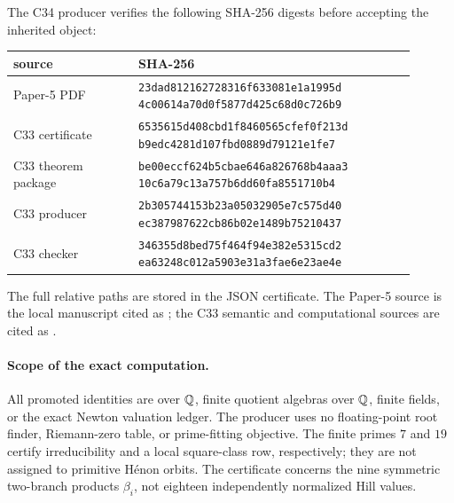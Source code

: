 The C34 producer verifies the following SHA-256 digests before accepting the
inherited object:
\begin{center}
\begin{tabular}{p{0.28\linewidth}p{0.62\linewidth}}
\toprule
source & SHA-256 \\
\midrule
Paper-5 PDF & \shortstack[l]{\scriptsize\texttt{23dad812162728316f633081e1a1995d}\\[-1pt]
\scriptsize\texttt{4c00614a70d0f5877d425c68d0c726b9}} \\
C33 certificate & \shortstack[l]{\scriptsize\texttt{6535615d408cbd1f8460565cfef0f213d}\\[-1pt]
\scriptsize\texttt{b9edc4281d107fbd0889d79121e1fe7}} \\
C33 theorem package & \shortstack[l]{\scriptsize\texttt{be00eccf624b5cbae646a826768b4aaa3}\\[-1pt]
\scriptsize\texttt{10c6a79c13a757b6dd60fa8551710b4}} \\
C33 producer & \shortstack[l]{\scriptsize\texttt{2b305744153b23a05032905e7c575d40}\\[-1pt]
\scriptsize\texttt{ec387987622cb86b02e1489b75210437}} \\
C33 checker & \shortstack[l]{\scriptsize\texttt{346355d8bed75f464f94e382e5315cd2}\\[-1pt]
\scriptsize\texttt{ea63248c012a5903e31a3fae6e23ae4e}} \\
\bottomrule
\end{tabular}
\end{center}

The full relative paths are stored in the JSON certificate.  The Paper-5
source is the local manuscript cited as \citet{wang2026henonmodel}; the C33
semantic and computational sources are cited as
\citet{hcs2026c33note,hcs2026c33certificate}.

\paragraph{Scope of the exact computation.}
All promoted identities are over \(\mathbb{Q}\), finite quotient algebras over
\(\mathbb{Q}\), finite fields, or the exact Newton valuation ledger.  The producer
uses no floating-point root finder, Riemann-zero table, or prime-fitting
objective.  The finite primes \(7\) and \(19\) certify irreducibility and a
local square-class row, respectively; they are not assigned to primitive
H\'enon orbits.  The certificate concerns the nine symmetric two-branch
products \(\beta_i\), not eighteen independently normalized Hill values.
